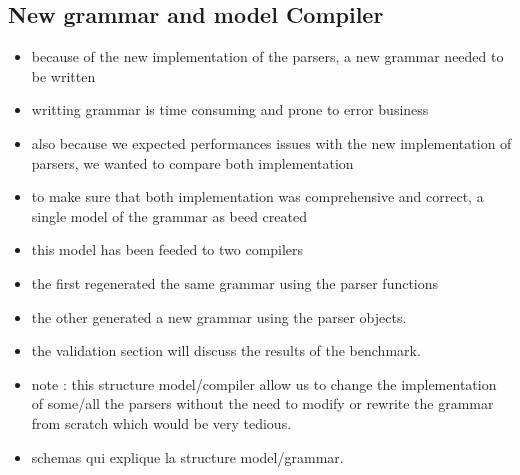 		\subsection{New grammar and model Compiler}
%
\begin{itemize}
	\item because of the new implementation of the parsers, a new grammar needed to be written
	\item writting grammar is time consuming and prone to error business
	\item also because we expected performances issues with the new implementation of parsers, we wanted to compare both implementation
	\item to make sure that both implementation was comprehensive and correct, a single model of the grammar as beed created
	\item this model has been feeded to two compilers
	\item the first regenerated the same grammar using the parser functions
	\item the other generated a new grammar using the parser objects.
	\item the validation section will discuss the results of the benchmark.
	\item note : this structure model/compiler allow us to change the implementation of some/all the parsers without the need to modify or rewrite the grammar from scratch which would be very tedious.
\end{itemize}

\begin{itemize}
	\item schemas qui explique la structure model/grammar.
\end{itemize}



